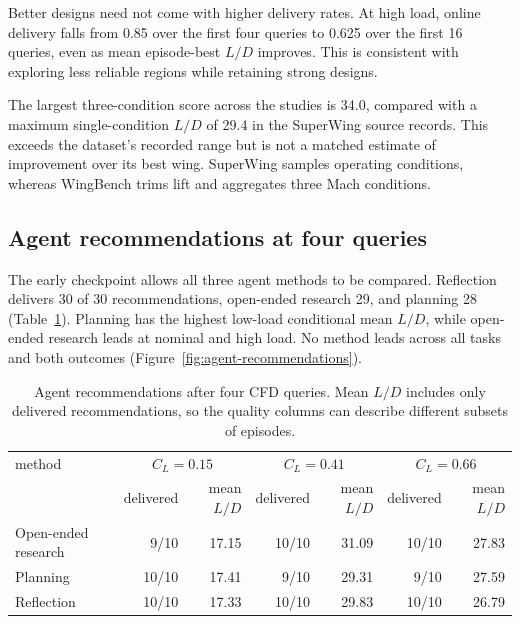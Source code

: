 \documentclass{article} %
\newcommand{\CampaignMaxLd}{34.0}
\newcommand{\OpenDeliveredAtFour}{29}
\newcommand{\PlanningDeliveredAtFour}{28}
\newcommand{\ReflectionDeliveredAtFour}{30}
\begin{document}
Better designs need not come with higher delivery rates.
At high load, online delivery falls from 0.85 over the first four queries to
0.625 over the first 16 queries, even as mean episode-best $L/D$ improves.
This is consistent with exploring less reliable regions while retaining
strong designs.

The largest three-condition score across the studies is \CampaignMaxLd{},
compared with a maximum single-condition $L/D$ of 29.4 in the SuperWing
source records. This exceeds the dataset's recorded range but is not a
matched estimate of improvement over its best wing. SuperWing samples
operating conditions, whereas WingBench trims lift and aggregates three
Mach conditions.

\subsection{Agent recommendations at four queries}

The early checkpoint allows all three agent methods to be compared.
Reflection delivers \ReflectionDeliveredAtFour{} of 30 recommendations,
open-ended research \OpenDeliveredAtFour{}, and planning
\PlanningDeliveredAtFour{} (Table~\ref{tab:agent-recommendations}).
Planning has the highest low-load conditional mean $L/D$, while open-ended
research leads at nominal and high load. No method leads across all tasks
and both outcomes (Figure~\ref{fig:agent-recommendations}).

\begin{table}[t]
\caption{Agent recommendations after four CFD queries. Mean $L/D$ includes only delivered recommendations,
so the quality columns can describe different subsets of episodes.}
\label{tab:agent-recommendations}
\centering
\scriptsize
\setlength{\tabcolsep}{3.2pt}
\begin{tabular*}{\textwidth}{@{\extracolsep{\fill}}lrrrrrr}
\toprule
method & \multicolumn{2}{c}{$C_L=0.15$} & \multicolumn{2}{c}{$C_L=0.41$} & \multicolumn{2}{c}{$C_L=0.66$} \\
 & delivered & mean $L/D$ & delivered & mean $L/D$ & delivered & mean $L/D$ \\
\midrule
Open-ended research & 9/10 & 17.15 & 10/10 & 31.09 & 10/10 & 27.83 \\
Planning & 10/10 & 17.41 & 9/10 & 29.31 & 9/10 & 27.59 \\
Reflection & 10/10 & 17.33 & 10/10 & 29.83 & 10/10 & 26.79 \\
\bottomrule
\end{tabular*}
\end{table}
\end{document}
